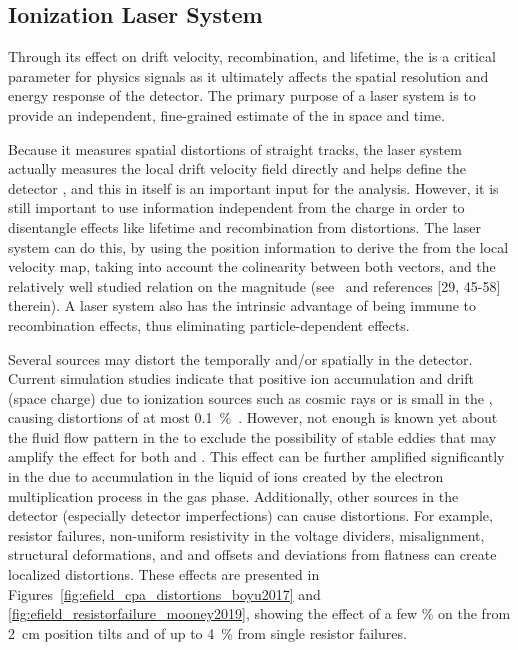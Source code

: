 \subsection{Ionization Laser System}
\label{sec:sp-calib-sys-las-ion}
Through its effect on drift velocity, recombination, and lifetime, the \efield is a critical parameter for physics signals as it ultimately affects the spatial resolution and energy response of the detector. The primary purpose of a laser system is to provide an independent, fine-grained estimate of the \efield in space and time. 

Because it measures spatial distortions of straight tracks, the laser system actually measures the local drift velocity field directly and helps define the detector , and this in itself is an important input for the  analysis. 
However, it is still important to use information independent from the charge in order to disentangle effects like lifetime and recombination from \efield distortions. The laser system can do this, by using the position information to derive the \efield from the local velocity map, taking into account the colinearity between both vectors, and the relatively well studied relation on the magnitude (see~\cite{Li:2015rqa} and references [29, 45-58] therein). A laser system also has the intrinsic advantage of being immune to recombination effects, thus eliminating particle-dependent effects.  

Several sources may distort the \efield temporally  and/or spatially in the detector. Current simulation studies indicate that positive ion accumulation and drift (space charge) due to ionization sources such as cosmic rays or  is small in the  , causing \efield distortions of at most \SI{0.1}{\%}~\cite{bib:mooney2018}.
However, not enough is known yet about the fluid flow pattern in the  to exclude the possibility of stable eddies that may amplify the effect for both  and . This effect can be further amplified significantly in the  due to  accumulation in the liquid of ions created by the electron multiplication process in the gas phase.
Additionally, other sources in the detector (especially detector imperfections) can cause \efield distortions. For example,  resistor failures, non-uniform resistivity in the voltage dividers,  misalignment,  structural deformations, and  and  offsets and  deviations from flatness can create localized \efield distortions. These effects are presented in Figures~\ref{fig:efield_cpa_distortions_boyu2017} and \ref{fig:efield_resistorfailure_mooney2019}, showing the effect of a few \% on the \efield from \SI{2}{\cm}  position tilts and of up to \SI{4}{\%} from  single resistor failures.

